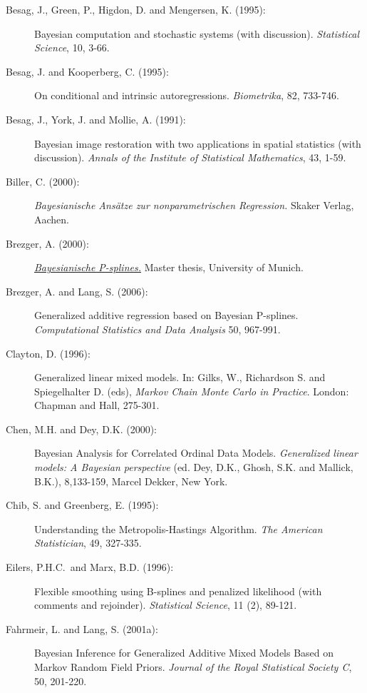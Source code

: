 \begin{description}

\item[Besag, J., Green, P., Higdon, D. and Mengersen, K. (1995):]
 Bayesian computation and stochastic systems (with discussion).
{\em Statistical Science}, 10, 3-66.

\item[Besag, J. and Kooperberg, C. (1995):] On conditional and intrinsic autoregressions.
{\em Biometrika}, 82, 733-746.

\item[Besag, J., York, J. and Mollie, A. (1991):]
Bayesian image restoration with two applications in spatial
statistics (with discussion). {\em Annals of the Institute of
Statistical Mathematics}, 43, 1-59.

\item[Biller, C. (2000):] {\em Bayesianische Ans\"atze zur nonparametrischen Regression.}
Skaker Verlag, Aachen.

\item[Brezger, A. (2000):] \href{http://www.stat.uni-muenchen.de/~andib}
{\em Bayesianische P-splines.} Master thesis, University of Munich.

\item[Brezger, A. and Lang, S. (2006):]
Generalized additive regression based on Bayesian P-splines. {\em
Computational Statistics and Data Analysis} 50, 967-991.

\item[Clayton, D. (1996):] Generalized linear mixed models. In: Gilks, W., Richardson S. and
Spiegelhalter D. (eds), {\em Markov Chain Monte Carlo in
Practice}. London: Chapman and Hall, 275-301.

\item[Chen, M.H. and Dey, D.K. (2000):] Bayesian Analysis for Correlated Ordinal Data Models.
{\em Generalized linear models: A Bayesian perspective} (ed. Dey,
D.K., Ghosh, S.K. and Mallick, B.K.), 8,133-159, Marcel Dekker,
New York.

\item[Chib, S. and Greenberg, E. (1995):] Understanding the
Metropolis-Hastings Algorithm. {\em The American Statistician},
49, 327-335.

\item [Eilers, P.H.C.~and Marx, B.D. (1996):]
Flexible smoothing using B-splines and penalized likelihood (with
comments and rejoinder). {\it Statistical Science}, 11 (2),
89-121.

\item[Fahrmeir, L. and Lang, S. (2001a):]
Bayesian Inference for Generalized Additive Mixed Models Based on
Markov Random Field Priors. {\em Journal of the Royal Statistical
Society C}, 50, 201-220.


\end{description}
